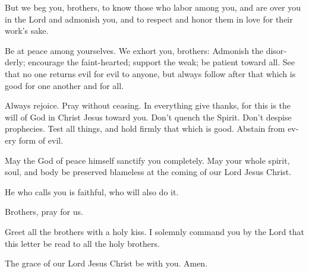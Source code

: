 \begin{paracol}{2}
\begin{otherlanguage}{english}
 But we beg you, brothers, to know those who labor among
you, and are over you in the Lord and admonish you,  and
to respect and honor them in love for their work's sake.

Be at peace among yourselves.  We exhort you, brothers:
Admonish the disorderly; encourage the faint-hearted; support the weak;
be patient toward all.  See that no one returns evil for
evil to anyone, but always follow after that which is good for one
another and for all.

 Always rejoice.  Pray without ceasing.
 In everything give thanks, for this is the will of God
in Christ Jesus toward you.  Don't quench the Spirit.
 Don't despise prophecies.  Test all
things, and hold firmly that which is good.  Abstain from
every form of evil.

 May the God of peace himself sanctify you completely.
May your whole spirit, soul, and body be preserved blameless at the
coming of our Lord Jesus Christ.

 He who calls you is faithful, who will also do it.

 Brothers, pray for us.

 Greet all the brothers with a holy kiss. 
I solemnly command you by the Lord that this letter be read to all the
holy brothers.

 The grace of our Lord Jesus Christ be with you. Amen.
\end{otherlanguage} \end{paracol}
